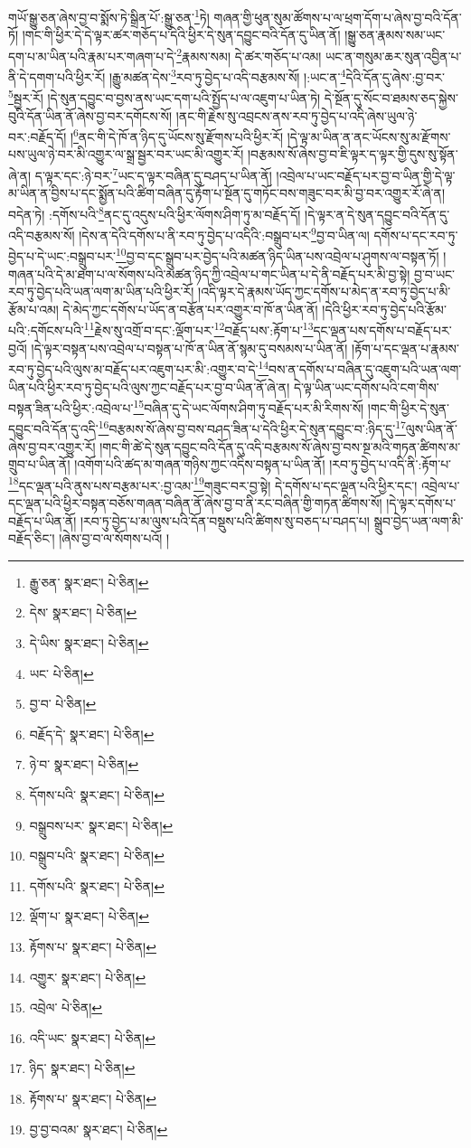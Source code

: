 གཡོ་སྒྱུ་ཅན་ཞེས་བྱ་བ་སྨོས་ཏེ་སྒྲིན་པོ་:སྒྱུ་ཅན་\footnote{རྒྱུ་ཅན་  སྣར་ཐང་།  པེ་ཅིན། }ཏེ། གཞན་གྱི་ཕུན་སུམ་ཚོགས་པ་ལ་ཕྲག་དོག་པ་ཞེས་བྱ་བའི་དོན་ཏོ། །གང་གི་ཕྱིར་དེ་དེ་ལྟར་ཚར་གཅོད་པ་དེའི་ཕྱིར་དེ་སུན་དབྱུང་བའི་དོན་དུ་ཡིན་ནོ། །སྒྱུ་ཅན་རྣམས་སམ་ཡང་དག་པ་མ་ཡིན་པའི་རྣམ་པར་གཞག་པ་དེ་\footnote{དེས་  སྣར་ཐང་།  པེ་ཅིན། }རྣམས་སམ། དེ་ཚར་གཅོད་པ་འམ། ཡང་ན་གསུམ་ཆར་སུན་འབྱིན་པ་ནི་དེ་དགག་པའི་ཕྱིར་རོ། །རྒྱུ་མཚན་དེས་\footnote{དེ་ཡིས་  སྣར་ཐང་།  པེ་ཅིན། }རབ་ཏུ་བྱེད་པ་འདི་བརྩམས་སོ། །:ཡང་ན་\footnote{ཡང་  པེ་ཅིན། }དེའི་དོན་དུ་ཞེས་:བྱ་བར་\footnote{བྱ་བ་  པེ་ཅིན། }སྦྱར་རོ། །དེ་སུན་དབྱུང་བ་བྱས་ནས་ཡང་དག་པའི་སྤྱོད་པ་ལ་འཇུག་པ་ཡིན་ཏེ། དེ་སྔོན་དུ་སོང་བ་ཐམས་ཅད་སྐྱེས་བུའི་དོན་ཡིན་ནོ་ཞེས་བྱ་བར་དགོངས་སོ། །ནང་གི་རྗེས་སུ་འབྲངས་ནས་རབ་ཏུ་བྱེད་པ་འདི་ཞེས་ཡུལ་ཉེ་བར་:བརྗོད་དོ། །\footnote{བརྗོད་དེ་  སྣར་ཐང་།  པེ་ཅིན། }ནང་གི་དེ་ཁོ་ན་ཉིད་དུ་ཡོངས་སུ་རྫོགས་པའི་ཕྱིར་རོ། །དེ་ལྟ་མ་ཡིན་ན་ནང་ཡོངས་སུ་མ་རྫོགས་པས་ཡུལ་ཉེ་བར་མི་འགྱུར་ལ་སྒྲ་སྦྱར་བར་ཡང་མི་འགྱུར་རོ། །བརྩམས་སོ་ཞེས་བྱ་བ་ཇི་ལྟར་ད་ལྟར་གྱི་དུས་སུ་སྟོན་ཞེ་ན། ད་ལྟར་དང་:ཉེ་བར་\footnote{ཉེ་བ་  སྣར་ཐང་།  པེ་ཅིན། }ཡང་ད་ལྟར་བཞིན་དུ་བཤད་པ་ཡིན་ནོ། །འབྲེལ་པ་ཡང་བརྗོད་པར་བྱ་བ་ཡིན་གྱི་དེ་ལྟ་མ་ཡིན་ན་བྱིས་པ་དང་སྨྱོན་པའི་ཚིག་བཞིན་དུ་རྟོག་པ་སྔོན་དུ་གཏོང་བས་གཟུང་བར་མི་བྱ་བར་འགྱུར་རོ་ཞེ་ན། བདེན་ཏེ། :དགོས་པའི་\footnote{དོགས་པའི་  སྣར་ཐང་།  པེ་ཅིན། }ནང་དུ་འདུས་པའི་ཕྱིར་ལོགས་ཤིག་ཏུ་མ་བརྗོད་དོ། །དེ་ལྟར་ན་དེ་སུན་དབྱུང་བའི་དོན་དུ་འདི་བརྩམས་སོ། །དེས་ན་དེའི་དགོས་པ་ནི་རབ་ཏུ་བྱེད་པ་འདིའི་:བསྒྲུབ་པར་\footnote{བསྒྲུབས་པར་  སྣར་ཐང་།  པེ་ཅིན། }བྱ་བ་ཡིན་ལ། དགོས་པ་དང་རབ་ཏུ་བྱེད་པ་དེ་ཡང་:བསྒྲུབ་པར་\footnote{བསྒྲུབ་པའི་  སྣར་ཐང་།  པེ་ཅིན། }བྱ་བ་དང་སྒྲུབ་པར་བྱེད་པའི་མཚན་ཉིད་ཡིན་པས་འབྲེལ་པ་ཤུགས་ལ་བསྟན་ཏོ། །གཞན་པའི་དེ་མ་ཐག་པ་ལ་སོགས་པའི་མཚན་ཉིད་ཀྱི་འབྲེལ་པ་གང་ཡིན་པ་དེ་ནི་བརྗོད་པར་མི་བྱ་སྟེ། བྱ་བ་ཡང་རབ་ཏུ་བྱེད་པའི་ཡན་ལག་མ་ཡིན་པའི་ཕྱིར་རོ། །འདི་ལྟར་དེ་རྣམས་ཡོད་ཀྱང་དགོས་པ་མེད་ན་རབ་ཏུ་བྱེད་པ་མི་རྩོམ་པ་འམ། དེ་མེད་ཀྱང་དགོས་པ་ཡོད་ན་བརྩོན་པར་འགྱུར་བ་ཁོ་ན་ཡིན་ནོ། །དེའི་ཕྱིར་རབ་ཏུ་བྱེད་པའི་རྩོམ་པའི་:དགོངས་པའི་\footnote{དགོས་པའི་  སྣར་ཐང་།  པེ་ཅིན། }རྗེས་སུ་འགྲོ་བ་དང་:ལྡོག་པར་\footnote{ལྡོག་པ་  སྣར་ཐང་།  པེ་ཅིན། }བརྗོད་པས་:རྟོག་པ་\footnote{རྟོགས་པ་  སྣར་ཐང་།  པེ་ཅིན། }དང་ལྡན་པས་དགོས་པ་བརྗོད་པར་བྱའོ། །དེ་ལྟར་བསྟན་པས་འབྲེལ་པ་བསྟན་པ་ཁོ་ན་ཡིན་ནོ་སྙམ་དུ་བསམས་པ་ཡིན་ནོ། །རྟོག་པ་དང་ལྡན་པ་རྣམས་རབ་ཏུ་བྱེད་པའི་ལུས་མ་བརྗོད་པར་འཇུག་པར་མི་:འགྱུར་བ་དེ་\footnote{འགྱུར་  སྣར་ཐང་།  པེ་ཅིན། }བས་ན་དགོས་པ་བཞིན་དུ་འཇུག་པའི་ཡན་ལག་ཡིན་པའི་ཕྱིར་རབ་ཏུ་བྱེད་པའི་ལུས་ཀྱང་བརྗོད་པར་བྱ་བ་ཡིན་ནོ་ཞེ་ན། དེ་ལྟ་ཡིན་ཡང་དགོས་པའི་ངག་གིས་བསྟན་ཟིན་པའི་ཕྱིར་:འབྲེལ་པ་\footnote{འབྲེལ་  པེ་ཅིན། }བཞིན་དུ་དེ་ཡང་ལོགས་ཤིག་ཏུ་བརྗོད་པར་མི་རིགས་སོ། །གང་གི་ཕྱིར་དེ་སུན་དབྱུང་བའི་དོན་དུ་འདི་\footnote{འདི་ཡང་  སྣར་ཐང་།  པེ་ཅིན། }བརྩམས་སོ་ཞེས་བྱ་བས་བཤད་ཟིན་པ་དེའི་ཕྱིར་དེ་སུན་དབྱུང་བ་:ཉིད་དུ་\footnote{ཉིད་  སྣར་ཐང་།  པེ་ཅིན། }ལུས་ཡིན་ནོ་ཞེས་བྱ་བར་འགྱུར་རོ། །གང་གི་ཚེ་དེ་སུན་དབྱུང་བའི་དོན་དུ་འདི་བརྩམས་སོ་ཞེས་བྱ་བས་སྔ་མའི་གཏན་ཚིགས་མ་གྲུབ་པ་ཡིན་ནོ། །འགོག་པའི་ཚད་མ་གཞན་གཉིས་ཀྱང་འདིས་བསྟན་པ་ཡིན་ནོ། །རབ་ཏུ་བྱེད་པ་འདི་ནི་:རྟོག་པ་\footnote{རྟོགས་པ་  སྣར་ཐང་།  པེ་ཅིན། }དང་ལྡན་པའི་ནུས་པས་བརྩམ་པར་:བྱ་འམ་\footnote{བྱ་བྱ་བའམ་  སྣར་ཐང་།  པེ་ཅིན། }གཟུང་བར་བྱ་སྟེ། དེ་དགོས་པ་དང་ལྡན་པའི་ཕྱིར་དང་། འབྲེལ་པ་དང་ལྡན་པའི་ཕྱིར་བསྟན་བཅོས་གཞན་བཞིན་ནོ་ཞེས་བྱ་བ་ནི་རང་བཞིན་གྱི་གཏན་ཚིགས་སོ། །དེ་ལྟར་དགོས་པ་བརྗོད་པ་ཡིན་ནོ། །རབ་ཏུ་བྱེད་པ་མ་ལུས་པའི་དོན་བསྡུས་པའི་ཚིགས་སུ་བཅད་པ་བཤད་པ། སྒྲུབ་བྱེད་ཡན་ལག་མི་བརྗོད་ཅིང་། །ཞེས་བྱ་བ་ལ་སོགས་པའོ། །
